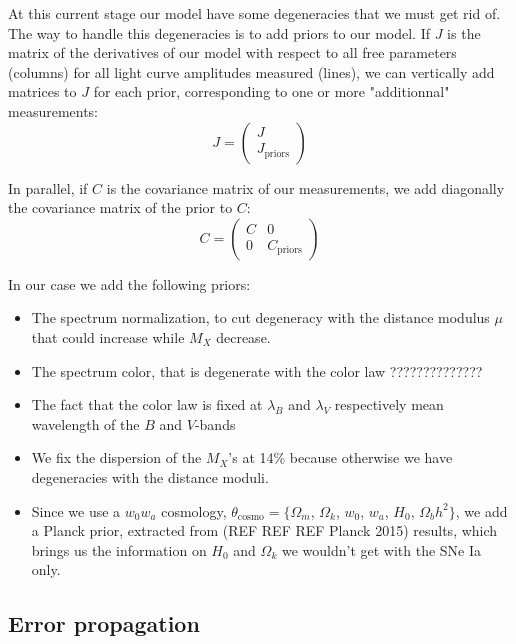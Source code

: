\documentclass[\docopts]{\docclass}
\begin{document}
At this current stage our model have some degeneracies that we must get rid of.
The way to handle this degeneracies is to add priors to our model.
If $J$ is the matrix of the derivatives  of our model with respect to all free parameters (columns) for all light curve amplitudes measured (lines), we can vertically add matrices to $J$ for each prior, corresponding to one or more "additionnal" measurements:
\begin{equation}
J =
\begin{pmatrix}
  J \\
  J_\text{priors}
\end{pmatrix} 
\end{equation}

In parallel, if $C$ is the covariance matrix of our measurements, we add diagonally the covariance matrix of the prior to $C$:
\begin{equation}
C =
\begin{pmatrix}
  C & 0 \\
  0 & C_\text{priors}
\end{pmatrix} 
\end{equation}

In our case we add the following priors:
\begin{itemize}
\item The spectrum normalization, to cut degeneracy with the distance modulus $\mu$ that could increase while $M_X$ decrease.
\item The spectrum color, that is degenerate with the color law ??????????????
\item The fact that the color law is fixed at $\lambda_B$ and $\lambda_V$ respectively mean wavelength of the $B$ and $V$-bands
\item We fix the dispersion of the $M_X$'s at 14\% because otherwise we have degeneracies with the distance moduli.
\item Since we use a $w_0w_a$ cosmology, $\theta_\text{cosmo} = \{ \Omega_m$, $\Omega_k$, $w_0$, $w_a$, $H_0$, $\Omega_bh^2 \}$, we add a Planck prior, extracted from (REF REF REF Planck 2015) results, which brings us the information on $H_0$ and $\Omega_k$ we wouldn't get with the SNe Ia only.
\end{itemize}



\subsection{Error propagation}
\label{sec::linalg}
\end{document}
